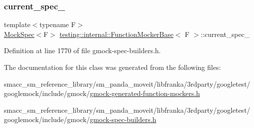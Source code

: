 \subsubsection{\texorpdfstring{current\+\_\+spec\+\_\+}{current\_spec\_}}
{\footnotesize\ttfamily template$<$typename F$>$ \\
\hyperlink{classtesting_1_1internal_1_1MockSpec}{Mock\+Spec}$<$F$>$ \hyperlink{classtesting_1_1internal_1_1FunctionMockerBase}{testing\+::internal\+::\+Function\+Mocker\+Base}$<$ F $>$\+::current\+\_\+spec\+\_\+\hspace{0.3cm}{\ttfamily [private]}}



Definition at line 1770 of file gmock-\/spec-\/builders.\+h.



The documentation for this class was generated from the following files\+:\begin{DoxyCompactItemize}
\item 
smacc\+\_\+sm\+\_\+reference\+\_\+library/sm\+\_\+panda\+\_\+moveit/libfranka/3rdparty/googletest/googlemock/include/gmock/\hyperlink{gmock-generated-function-mockers_8h}{gmock-\/generated-\/function-\/mockers.\+h}\item 
smacc\+\_\+sm\+\_\+reference\+\_\+library/sm\+\_\+panda\+\_\+moveit/libfranka/3rdparty/googletest/googlemock/include/gmock/\hyperlink{gmock-spec-builders_8h}{gmock-\/spec-\/builders.\+h}\end{DoxyCompactItemize}
